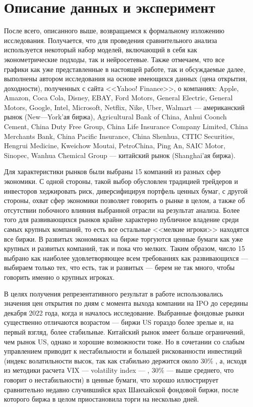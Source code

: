 \section{Описание данных и эксперимент}
После всего, описанного выше, возвращаемся к формальному изложению исследования. Получается, что для проведения сравнительного анализа используется некоторый набор моделей, включающий в себя как эконометрические подходы, так и нейросетевые. Также отмечаем, что все графики как уже представленные в настоящей работе, так и обсуждаемые далее, выполнены автором исследования на основе имеющихся данных (цена открытия, доходности), полученных с сайта <<Yahoo! Finance>>, о компаниях: Apple, Amazon, Coca Cola, Disney, EBAY, Ford Motors, General Electric, General Motors, Google, Intel, Microsoft, Netflix, Nike, Uber, Walmart --- американский рынок (New---York'ая биржа), Agricultural Bank of China, Anhui Coonch Cement, China Duty Free Group, China Life Insurance Company Limited, China Merchants Bank, China Pacific Insurance, China Shenhua, CITIC Securities, Hengrui Medicine, Kweichow Moutai, PetroChina, Ping An, SAIC Motor, Sinopec, Wanhua Chemical Group --- китайский рынок (Shanghai'ая биржа).

Для характеристики рынков были выбраны 15 компаний из разных сфер экономики. С одной стороны, такой выбор обусловлен традицией трейдеров и инвесторов хеджировать риск, диверсифицируя портфель ценных бумаг, с другой стороны, охват сфер экономики позволяет говорить о рынке в целом, а также об отсутствии побочного влияния выбранной отрасли на результат анализа. Более того для развивающихся рынков крайне характерно публичное владение среди самых крупных компаний, то есть все остальные <<мелкие игроки>> находятся все биржи. В развитых экономиках на бирже торгуются ценные бумаги как уже крупных и развитых компаний, так и пока что мелких. Таким образом, число 15 выбрано как наиболее удовлетворяющее всем требованиях как развивающихся --- выбираем только тех, что есть, так и развитых --- берем не так много, чтобы говорить именно о крупных игроках.

В целях получения репрезентативного результат в работе использовались значения цен открытия по дням с момента выхода компании на IPO до середины декабря 2022 года, когда и началось исследование. Выбранные фондовые рынки существенно отличаются возрастом --- биржи US гораздо более зрелые и, на первый взгляд, более стабильные. Китайский рынок имеет больше ограничений, чем рынок US, однако и хорошие возможности тоже. Но в сочетании со слабым управлением приводит к нестабильности и большей рискованности инвестиций (индекс волатильности высок, так как стабильно держится около $30\%$ \cite{ycharts2023ChinaETF}, а, исходя из методики расчета VIX --- volatility index --- \cite{finam2023VIX}, $30\%$ --- выше среднего, что говорит о нестабильности) в ценные бумаги, что хорошо иллюстрирует сравнительно недавно случившийся крах Шанхайской фондовой биржи, после которого биржа в целом приостановила торги на несколько дней. 


